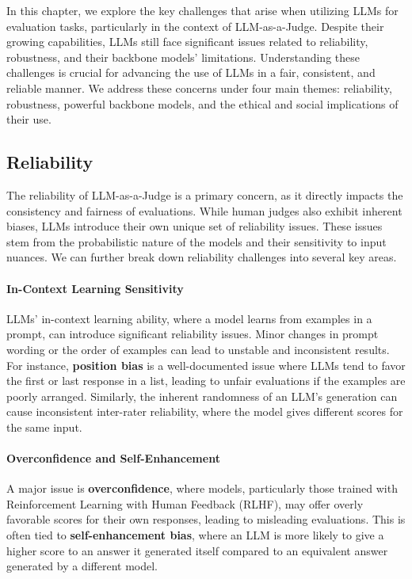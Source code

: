 In this chapter, we explore the key challenges that arise when utilizing LLMs for evaluation tasks, particularly in the context of LLM-as-a-Judge. Despite their growing capabilities, LLMs still face significant issues related to reliability, robustness, and their backbone models' limitations. Understanding these challenges is crucial for advancing the use of LLMs in a fair, consistent, and reliable manner. We address these concerns under four main themes: reliability, robustness, powerful backbone models, and the ethical and social implications of their use.

\subsection{Reliability}
\label{subsec: challenge_reliability}
The reliability of LLM-as-a-Judge is a primary concern, as it directly impacts the consistency and fairness of evaluations. While human judges also exhibit inherent biases, LLMs introduce their own unique set of reliability issues. These issues stem from the probabilistic nature of the models and their sensitivity to input nuances. We can further break down reliability challenges into several key areas.

\paragraph{\textbf{In-Context Learning Sensitivity}}
LLMs' in-context learning ability, where a model learns from examples in a prompt, can introduce significant reliability issues. Minor changes in prompt wording or the order of examples can lead to unstable and inconsistent results. For instance, \textbf{position bias} is a well-documented issue where LLMs tend to favor the first or last response in a list, leading to unfair evaluations if the examples are poorly arranged. Similarly, the inherent randomness of an LLM's generation can cause inconsistent inter-rater reliability, where the model gives different scores for the same input.

\paragraph{\textbf{Overconfidence and Self-Enhancement}}
A major issue is \textbf{overconfidence}, where models, particularly those trained with Reinforcement Learning with Human Feedback (RLHF), may offer overly favorable scores for their own responses, leading to misleading evaluations. This is often tied to \textbf{self-enhancement bias}, where an LLM is more likely to give a higher score to an answer it generated itself compared to an equivalent answer generated by a different model.

